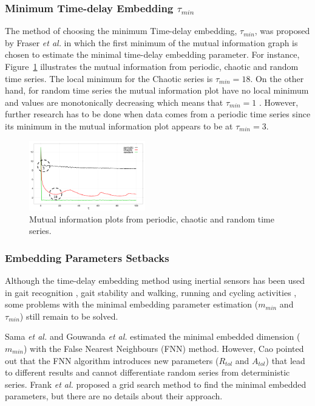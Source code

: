 \documentclass[10pt,journal,compsoc]{IEEEtran}
\begin{document}
\subsubsection{Minimum Time-delay Embedding  $\tau_{min}$}
The method of choosing the minimum Time-delay embedding, $\tau_{min}$, was proposed 
by Fraser \emph{et al.} \cite{Fraser1986} in which the first minimum of the mutual 
information graph is chosen to estimate the minimal time-delay embedding parameter.
For instance, Figure~\ref{fig:mi}  illustrates 
the mutual information from periodic, chaotic and random time series.
The local minimum for the Chaotic series is $\tau_{min} = 18$.
On the other hand, for random time series the mutual information plot have no local minimum 
and values are monotonically decreasing which means that $\tau_{min} = 1$  \cite{Fraser1986}.
However, further research has to be done when data comes from a periodic time series 
since its minimum in the mutual information plot appears to be at $\tau_{min} = 3$.

\begin{figure}[!htb]
\centering    
\includegraphics[width=0.45\textwidth]{mi_values_v02}
\caption[PA]{Mutual information plots from periodic, chaotic and random time series.}
\label{fig:mi}
\end{figure}


\subsubsection{Embedding Parameters Setbacks}
Although the time-delay embedding method using inertial sensors has been used  
in gait recognition \cite{Sama2013}, gait stability \cite{Gouwanda2012} and walking, 
running and cycling activities \cite{Frank2010},
some problems with the minimal embedding parameter estimation  
($m_{min}$ and $\tau_{min}$) still remain to be solved.


Sama \emph{et al.} \cite{Sama2013} and Gouwanda \emph{et al.} \cite{Gouwanda2012}
estimated the minimal embedded dimension ($m_{min}$) 
with the False Nearest Neighbours (FNN) method. However, Cao \cite{Cao1997} pointed out that 
the FNN algorithm introduces new parameters ($R_{tol}$ and $A_{tol}$) that lead 
to different results and  cannot differentiate random series from deterministic series. 
Frank \emph{et al.} \cite{Frank2010} proposed a grid search method to find the minimal 
embedded parameters, but there are no details about their approach.
\end{document}
